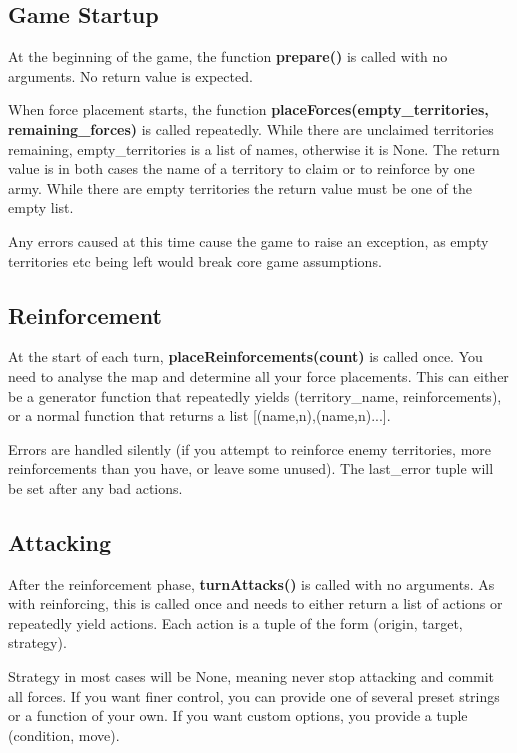 \documentclass[12pt,a4paper]{article}
\begin{document}
\subsection{Game Startup}

At the beginning of the game, the function \textbf{prepare()} is called with no arguments. No return value is expected.

When force placement starts, the function \textbf{placeForces(empty\_territories, remaining\_forces)} is called repeatedly. While there are unclaimed territories remaining, empty\_territories is a list of names, otherwise it is None. The return value is in both cases the name of a territory to claim or to reinforce by one army. While there are empty territories the return value must be one of the empty list.

Any errors caused at this time cause the game to raise an exception, as empty territories etc being left would break core game assumptions.

\subsection{Reinforcement}

At the start of each turn, \textbf{placeReinforcements(count)} is called once. You need to analyse the map and determine all your force placements. This can either be a generator function that repeatedly yields (territory\_name, reinforcements), or a normal function that returns a list [(name,n),(name,n)...].

Errors are handled silently (if you attempt to reinforce enemy territories, more reinforcements than you have, or leave some unused). The last\_error tuple will be set after any bad actions.

\subsection{Attacking}

After the reinforcement phase, \textbf{turnAttacks()} is called with no arguments. As with reinforcing, this is called once and needs to either return a list of actions or repeatedly yield actions. Each action is a tuple of the form (origin, target, strategy).

Strategy in most cases will be None, meaning never stop attacking and commit all forces. If you want finer control, you can provide one of several preset strings or a function of your own. If you want custom options, you provide a tuple (condition, move).
\end{document}
